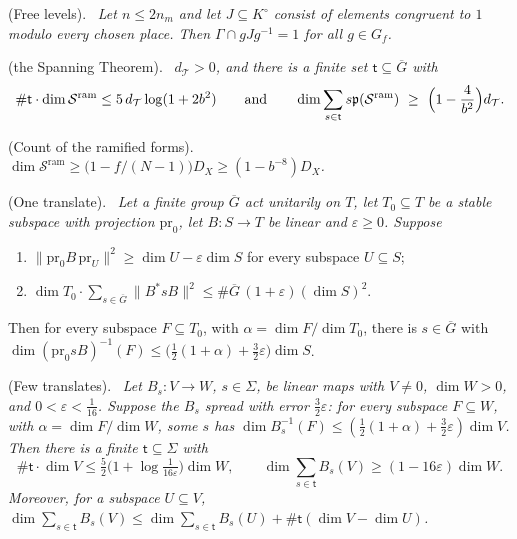 \documentclass[10pt]{amsart}
\theoremstyle{definition}
\theoremstyle{remark}
\providecommand{\auDX}{D_X}
\providecommand{\auG}{\overline G}
\providecommand{\auSram}{\mathcal S^{\mathrm{ram}}}
\providecommand{\auT}{\mathcal T}
\providecommand{\audT}{d_{\auT}}
\providecommand{\aupp}{\mathfrak p}
\newenvironment{quotedthm}[2]{\par\medskip\noindent\begingroup
  \textbf{#1}#2.\ \itshape\ignorespaces}{\endgroup\par\medskip}
\begin{document}
\begin{quotedthm}{\cite[Lemma~14.5]{P46}}{ (Free levels)}
Let $n\le2n_m$ and let $J\subseteq K^\circ$ consist of elements congruent to $1$ modulo every
chosen place. Then $\Gamma\cap gJg^{-1}=1$ for all $g\in G_f$.
\end{quotedthm}

\begin{quotedthm}{\cite[Theorem~14.14]{P46}}{ (the Spanning Theorem)}
$\audT>0$, and there is a finite set $\mathsf t\subseteq\auG$ with
\[
\#\mathsf t\cdot\dim\auSram\le5\,\audT\log(1+2b^2)\qquad\text{and}\qquad
\dim\sum_{s\in\mathsf t}s\aupp(\auSram)\ \ge\ \Bigl(1-\frac4{b^2}\Bigr)\audT .
\]
\end{quotedthm}

\begin{quotedthm}{\cite[Lemma~14.29]{P46}}{ (Count of the ramified forms)}
$\dim\auSram\ge\bigl(1-f/(N-1)\bigr)\auDX\ge(1-b^{-8})\auDX$.
\end{quotedthm}

\begin{quotedthm}{\cite[Lemma~14.30]{P46}}{ (One translate)}
Let a finite group $\auG$ act unitarily on $T$, let $T_0\subseteq T$ be a stable subspace with
projection $\mathrm{pr}_0$, let $B\colon S\to T$ be linear and $\varepsilon\ge0$. Suppose
\begin{enumerate}
\item[(H1)] $\|\mathrm{pr}_0B\,\mathrm{pr}_U\|^2\ge\dim U-\varepsilon\dim S$ for every subspace
$U\subseteq S$;
\item[(H2)] $\dim T_0\cdot\sum_{s\in\auG}\|B^*sB\|^2\le\#\auG\,(1+\varepsilon)(\dim S)^2$.
\end{enumerate}
Then for every subspace $F\subseteq T_0$, with $\alpha=\dim F/\dim T_0$, there is $s\in\auG$ with
$\dim(\mathrm{pr}_0sB)^{-1}(F)\le\bigl(\tfrac12(1+\alpha)+\tfrac32\varepsilon\bigr)\dim S$.
\end{quotedthm}

\begin{quotedthm}{\cite[Lemma~14.31]{P46}}{ (Few translates)}
Let $B_s\colon V\to W$, $s\in\Sigma$, be linear maps with $V\ne0$, $\dim W>0$, and
$0<\varepsilon<\tfrac1{16}$. Suppose the $B_s$ \emph{spread with error $\tfrac32\varepsilon$}: for
every subspace $F\subseteq W$, with $\alpha=\dim F/\dim W$, some $s$ has
$\dim B_s^{-1}(F)\le(\tfrac12(1+\alpha)+\tfrac32\varepsilon)\dim V$. Then there is a finite
$\mathsf t\subseteq\Sigma$ with
\[
\#\mathsf t\cdot\dim V\le\tfrac52\bigl(1+\log\tfrac1{16\varepsilon}\bigr)\dim W,\qquad
\dim\sum_{s\in\mathsf t}B_s(V)\ge(1-16\varepsilon)\dim W .
\]
Moreover, for a subspace $U\subseteq V$,
$\dim\sum_{s\in\mathsf t}B_s(V)\le\dim\sum_{s\in\mathsf t}B_s(U)+\#\mathsf t(\dim V-\dim U)$.
\end{quotedthm}
\end{document}
